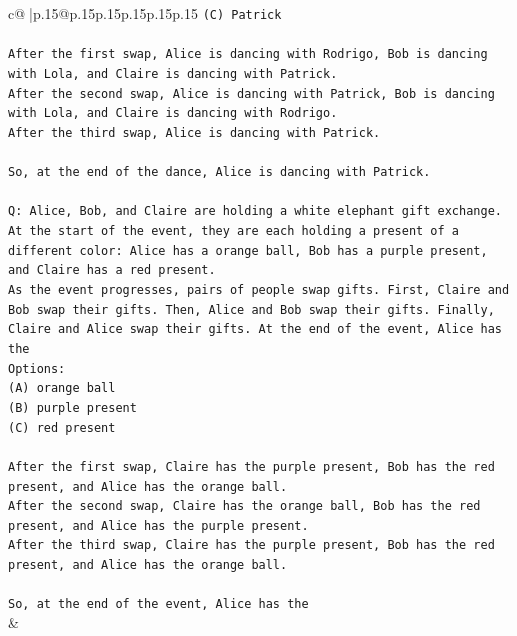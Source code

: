\documentclass{article}
\begin{document}
{\begin{supertabular}{c@{$\;$}|p{.15\linewidth}@{}p{.15\linewidth}p{.15\linewidth}p{.15\linewidth}p{.15\linewidth}p{.15\linewidth}}
{{{\texttt{(C) Patrick} \\
\\ 
\texttt{After the first swap, Alice is dancing with Rodrigo, Bob is dancing with Lola, and Claire is dancing with Patrick.} \\
\texttt{After the second swap, Alice is dancing with Patrick, Bob is dancing with Lola, and Claire is dancing with Rodrigo.} \\
\texttt{After the third swap, Alice is dancing with Patrick.} \\
\\ 
\texttt{So, at the end of the dance, Alice is dancing with Patrick.} \\
\\ 
\texttt{Q: Alice, Bob, and Claire are holding a white elephant gift exchange. At the start of the event, they are each holding a present of a different color: Alice has a orange ball, Bob has a purple present, and Claire has a red present.} \\
\texttt{As the event progresses, pairs of people swap gifts. First, Claire and Bob swap their gifts. Then, Alice and Bob swap their gifts. Finally, Claire and Alice swap their gifts. At the end of the event, Alice has the} \\
\texttt{Options:} \\
\texttt{(A) orange ball} \\
\texttt{(B) purple present} \\
\texttt{(C) red present} \\
\\ 
\texttt{After the first swap, Claire has the purple present, Bob has the red present, and Alice has the orange ball.} \\
\texttt{After the second swap, Claire has the orange ball, Bob has the red present, and Alice has the purple present.} \\
\texttt{After the third swap, Claire has the purple present, Bob has the red present, and Alice has the orange ball.} \\
\\ 
\texttt{So, at the end of the event, Alice has the} \\
            }
        }
    }
    & \\ \\


\end{supertabular}}
\end{document}

